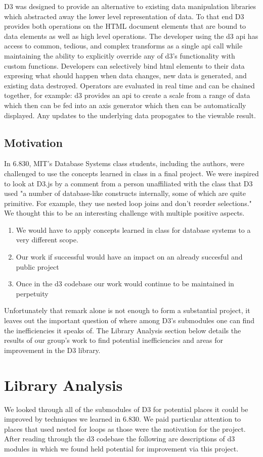 \documentclass[a4paper]{article}
\begin{document}
	 D3 was designed to provide an alternative to existing data manipulation libraries which abstracted away the lower level representation of data. To that end D3 provides both operations on the HTML document elements that are bound to data elements as well as high level operations. The developer using the d3 api has access to common, tedious, and complex transforms as a single api call while maintaining the ability to explicitly override any of d3's functionality with custom functions. Developers can selectively bind html elements to their data expresing what should happen when data changes, new data is generated, and existing data destroyed. Operators are evaluated in real time and can be chained together, for example: d3 provides an api to create a scale from a range of data which then can be fed into an axis generator which then can be automatically displayed. Any updates to the underlying data propogates to the viewable result.
\subsection{Motivation}
In 6.830, MIT's Database Systems class students, including the authors, were challenged to use the concepts learned in class in a final project. We were inspired to look at D3.js by a comment from a person unaffiliated with the class that D3 used "a number of database-like constructs internally, some of which are quite primitive. For example, they use nested loop joins and don’t reorder selections." We thought this to be an interesting challenge with multiple positive aspects.
\begin{enumerate}
\item We would have to apply concepts learned in class for database systems to a very different scope.
\item Our work if successful would have an impact on an already succesful and public project
\item Once in the d3 codebase our work would continue to be maintained in perpetuity
\end{enumerate}

Unfortunately that remark alone is not enough to form a substantial project, it leaves out the important question of where among D3's submodules one can find the inefficiencies it speaks of. The Library Analysis section below details the results of our group's work to find potential inefficiencies and areas for improvement in the D3 library.
\section{Library Analysis}
We looked through all of the submodules of D3 for potential places it could be improved by techniques we learned in 6.830. We paid particular attention to places that used nested for loops as those were the motivation for the project. After reading through the d3 codebase the following are descriptions of d3 modules in which we found held potential for improvement via this project.
\end{document}
